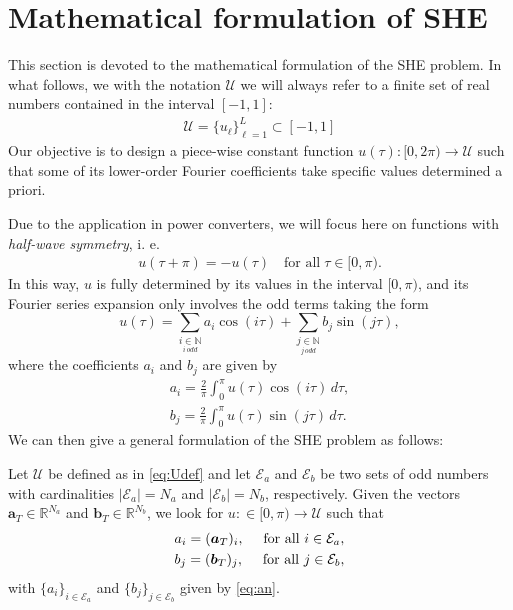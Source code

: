 \section{Mathematical formulation of SHE}\label{Section2}

This section is devoted to the mathematical formulation of the SHE problem. In what follows, we with the notation $\mathcal U$ we will always refer to a finite set of real numbers contained in the interval $[-1,1]$:
\begin{align}\label{eq:Udef}
	\mathcal U = \{u_\ell\}_{\ell=1}^L\subset [-1,1]
\end{align}
Our objective is to design a piece-wise constant function $u(\tau):[0,2\pi)\to\mathcal U$ such that some of its lower-order Fourier coefficients take specific values determined a priori. 

Due to the application in power converters, we will focus here on functions with \textit{half-wave symmetry}, i. e. 
\begin{align*}
	u(\tau + \pi) = -u(\tau)\quad \mbox{for all}\; \tau \in [0,\pi).
\end{align*}
In this way, $u$ is fully determined by its values in the interval $[0,\pi)$, and its Fourier series expansion only involves the odd terms taking the form
\begin{equation}
	u(\tau ) = \sum_{\underset{i\, odd}{i \in \mathbb{N}}} a_i \cos(i\tau)+ \sum_{\underset{j\, odd}{j \in \mathbb{N}}}  b_j \sin(j \tau), 
\end{equation}
where the coefficients $a_i$ and $b_j$ are given by
\begin{equation} \label{eq:an}
	\begin{aligned}
		a_i = \frac{2}{\pi} \int_0^\pi u(\tau ) \cos(i \tau)\,d\tau, 
		\\
		b_j = \frac{2}{\pi} \int_0^\pi u(\tau)  \sin(j \tau)\,d\tau.
	\end{aligned}
\end{equation}
We can then give a general formulation of the SHE problem as follows:
\newline
\begin{problem}[SHE]\label{SHEp}
Let $\mathcal{U}$ be defined as in \eqref{eq:Udef} and let $\mathcal{E} _a $ and $\mathcal{E} _b $ be two sets of odd numbers with cardinalities $|\mathcal{E}_a| = N_a $ and $ |\mathcal{E} _b| = N_b$, respectively. Given the vectors $\bm{a}_T \in \mathbb{R}^{N_a}$ and $\bm{b}_T \in \mathbb{R}^{N_b} $, we look for $u:\in [0,\pi)\to\mathcal{U}$ such that 
\begin{gather}
	\notag a_i = (\bm{a}_T)_i, \quad\textrm{ for all } i \in \mathcal{E}_a,
	\\
	\notag b_j = (\bm {b}_T)_j, \quad\textrm{ for all } j \in \mathcal{E}_b,
\end{gather}
with $\{a_i\}_{i\in\mathcal E_a}$ and $\{b_j\}_{j\in\mathcal E_b}$ given by \eqref{eq:an}.
\end{problem} 

